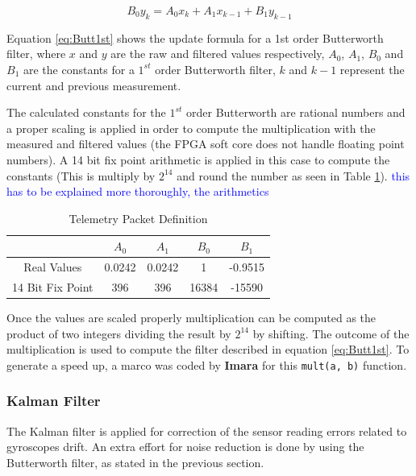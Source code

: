 \documentclass{article}
\newcommand\todo[1]{\textcolor{blue}{#1}} %
\begin{document}
\begin{equation}
	 B_0 y_k = A_0 x_k + A_1 x_{k-1} + B_1 y_{k-1}
	 \label{eq:Butt1st}
\end{equation}

Equation \ref{eq:Butt1st} shows the update formula for a 1st order Butterworth filter, where $x$ and $y$ are the raw and filtered values respectively, $A_0$, $A_1$, $B_0$ and $B_1$ are the constants for a $1^{st}$ order Butterworth filter, $k$ and $k-1$ represent the current and previous measurement.

The calculated constants for the $1^{st}$ order Butterworth are rational numbers and a proper scaling is applied in order to compute the multiplication with the measured and filtered values (the FPGA soft core does not handle floating point numbers). A 14 bit fix point arithmetic is applied in this case to compute the constants (This is multiply by $2^{14}$ and round the number as seen in Table \ref{tbl:ButtConstants}). \todo{this has to be explained more thoroughly, the arithmetics}

\begin{table}[ht]
\centering
\caption{Telemetry Packet Definition}
\begin{tabular}{|c|c|c|c|c|}
\hline 
 & $A_0$ & $A_1$ & $B_0$ & $B_1$ \\ 
\hline 
Real Values & 0.0242 & 0.0242 & 1 & -0.9515 \\ 
\hline 
14 Bit Fix Point & 396 & 396 & 16384 & -15590 \\ 
\hline 
\end{tabular}
\label{tbl:ButtConstants}
\end{table}

Once the values are scaled properly multiplication can be computed as the product of two integers dividing the result by $2^{14}$ by shifting. The outcome of the multiplication is used to compute the filter described in equation \ref{eq:Butt1st}. To generate a speed up, a marco was coded by \textbf{Imara} for this \texttt{mult(a, b)} function. 

\subsubsection{Kalman Filter}

The Kalman filter is applied for correction of the sensor reading errors related to gyroscopes drift. An extra effort for noise reduction is done by using the Butterworth filter, as stated in the previous section.
\end{document}
